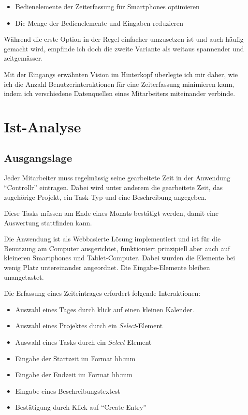 \documentclass[]{article}
\begin{document}
\begin{itemize}
\itemsep1pt\parskip0pt
\item
  Bedienelemente der Zeiterfassung für Smartphones optimieren
\item
  Die Menge der Bedienelemente und Eingaben reduzieren
\end{itemize}

Während die erste Option in der Regel einfacher umzusetzen ist und auch
häufig gemacht wird, empfinde ich doch die zweite Variante als weitaus
spannender und zeitgemässer.

Mit der Eingangs erwähnten Vision im Hinterkopf überlegte ich mir daher,
wie ich die Anzahl Benutzerinteraktionen für eine Zeiterfassung
minimieren kann, indem ich verschiedene Datenquellen eines Mitarbeiters
miteinander verbinde.

\newpage

\section{Ist-Analyse}\label{ist-analyse}

\subsection{Ausgangslage}\label{ausgangslage}

Jeder Mitarbeiter muss regelmässig seine gearbeitete Zeit in der
Anwendung ``Controllr'' eintragen. Dabei wird unter anderem die
gearbeitete Zeit, das zugehörige Projekt, ein Task-Typ und eine
Beschreibung angegeben.

Diese Tasks müssen am Ende eines Monats bestätigt werden, damit eine
Auswertung stattfinden kann.

Die Anwendung ist als Webbasierte Lösung implementiert und ist für die
Benutzung am Computer ausgerichtet, funktioniert prinzipiell aber auch
auf kleineren Smartphones und Tablet-Computer. Dabei wurden die Elemente
bei wenig Platz untereinander angeordnet. Die Eingabe-Elemente bleiben
unangetastet.

Die Erfassung eines Zeiteintrages erfordert folgende Interaktionen:

\begin{itemize}
\itemsep1pt\parskip0pt
\item
  Auswahl eines Tages durch klick auf einen kleinen Kalender.
\item
  Auswahl eines Projektes durch ein \emph{Select}-Element
\item
  Auswahl eines Tasks durch ein \emph{Select}-Element
\item
  Eingabe der Startzeit im Format hh:mm
\item
  Eingabe der Endzeit im Format hh:mm
\item
  Eingabe eines Beschreibungstextest
\item
  Bestätigung durch Klick auf ``Create Entry''
\end{itemize}
\end{document}
